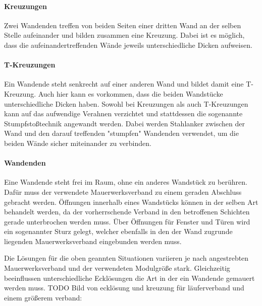 \paragraph{Kreuzungen}
Zwei Wandenden treffen von beiden Seiten einer dritten Wand an der selben Stelle aufeinander und bilden zusammen eine Kreuzung.
Dabei ist es möglich, dass die aufeinandertreffenden Wände jeweils unterschiedliche Dicken aufweisen.
\paragraph{T-Kreuzungen}
Ein Wandende steht senkrecht auf einer anderen Wand und bildet damit eine T-Kreuzung.
Auch hier kann es vorkommen, dass die beiden Wandstücke unterschiedliche Dicken haben.
Sowohl bei Kreuzungen als auch T-Kreuzungen kann auf das aufwendige Verahnen verzichtet und stattdessen die sogenannte Stumpfstoßtechnik angewandt werden.
Dabei werden Stahlanker zwischen der Wand und den darauf treffenden "stumpfen" Wandenden verwendet, um die beiden Wände sicher miteinander zu verbinden.
\paragraph{Wandenden}
Eine Wandende steht frei im Raum, ohne ein anderes Wandstück zu berühren. 
Dafür muss der verwendete Mauerwerksverband zu einem geraden Abschluss gebracht werden.
Öffnungen innerhalb eines Wandstücks können in der selben Art behandelt werden, da der vorherrschende Verband in den betroffenen Schichten gerade unterbrochen werden muss.
Über Öffnungen für Fenster und Türen wird ein sogenannter Sturz gelegt, welcher ebenfalls in den der Wand zugrunde liegenden Mauerwerksverband eingebunden werden muss.

Die Lösungen für die oben geannten Situationen variieren je nach angestrebten Mauerwerksverband und der verwendeten Modulgröße stark.
Gleichzeitig beeinflussen unterschiedliche Ecklösungen die Art in der ein Wandende gemauert werden muss.
TODO Bild von ecklösung und kreuzung für läuferverband und einem größerem verband:

